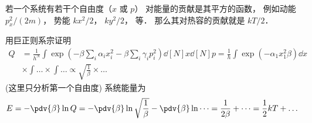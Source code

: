 
若一个系统有若干个自由度（$x$ 或 $p$） 对能量的贡献是其平方的函数， 例如动能 $p_x^2/(2m)$， 势能 $kx^2/2$， $ky^2/2$， 等． 那么其对热容的贡献就是 $kT/2$．

用巨正则系宗证明
\begin{equation}
\begin{aligned}
Q &= \frac{1}{h^N} \int \exp(-\beta \sum_i \alpha_i x_i^2 - \beta \sum_i \gamma_i p_i^2) \dd[N]{x} \dd[N]{p} = \frac{1}{h} \int \exp(-\alpha_1 x_1^2 \beta) \dd{x}\\
& \times \int \dots \times \int \dots \propto \sqrt{\frac{1}{\beta}} \times \dots
\end{aligned}
\end{equation}
(这里只分析第一个自由度)
系统能量为
\begin{equation}
E = -\pdv{\beta} \ln Q = -\pdv{\beta} \ln \sqrt{\frac{1}{\beta}} - \pdv{\beta} \ln \dots = \frac{1}{2\beta} + \dots = \frac{1}{2}kT + \dots
\end{equation}
